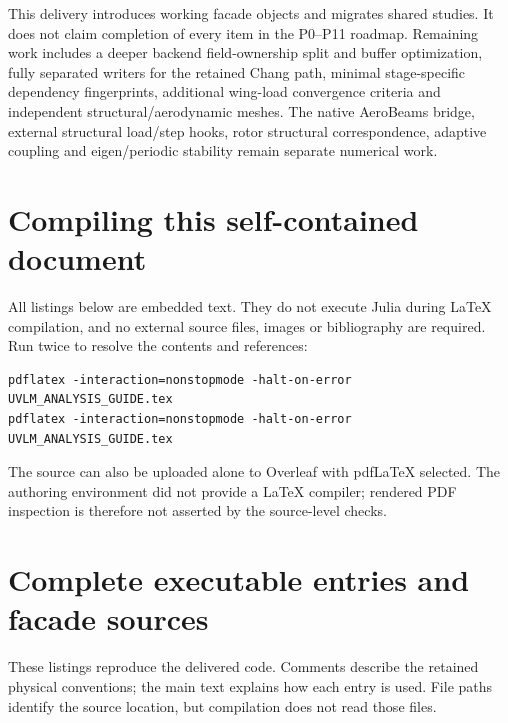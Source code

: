 \documentclass[11pt,a4paper]{article}
\begin{document}
This delivery introduces working facade objects and migrates shared studies.
It does not claim completion of every item in the P0--P11 roadmap. Remaining
work includes a deeper backend field-ownership split and buffer optimization,
fully separated writers for the retained Chang path, minimal stage-specific
dependency fingerprints, additional wing-load convergence criteria and
independent structural/aerodynamic meshes. The native AeroBeams bridge,
external structural load/step hooks, rotor structural correspondence, adaptive
coupling and eigen/periodic stability remain separate numerical work.

\section{Compiling this self-contained document}
All listings below are embedded text. They do not execute Julia during LaTeX
compilation, and no external source files, images or bibliography are required.
Run twice to resolve the contents and references:
\begin{lstlisting}
pdflatex -interaction=nonstopmode -halt-on-error UVLM_ANALYSIS_GUIDE.tex
pdflatex -interaction=nonstopmode -halt-on-error UVLM_ANALYSIS_GUIDE.tex
\end{lstlisting}
The source can also be uploaded alone to Overleaf with pdfLaTeX selected.
The authoring environment did not provide a LaTeX compiler; rendered PDF
inspection is therefore not asserted by the source-level checks.

\appendix
\section{Complete executable entries and facade sources}
These listings reproduce the delivered code. Comments describe the retained physical conventions; the main text explains how each entry is used. File paths identify the source location, but compilation does not read those files.
\end{document}
